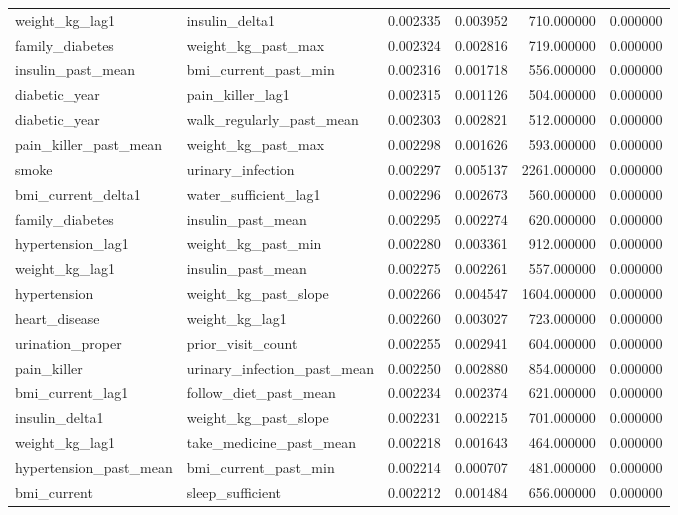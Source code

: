 \begin{longtable}{llrrrr}
weight\_kg\_lag1 & insulin\_delta1 & 0.002335 & 0.003952 & 710.000000 & 0.000000 \\
family\_diabetes & weight\_kg\_past\_max & 0.002324 & 0.002816 & 719.000000 & 0.000000 \\
insulin\_past\_mean & bmi\_current\_past\_min & 0.002316 & 0.001718 & 556.000000 & 0.000000 \\
diabetic\_year & pain\_killer\_lag1 & 0.002315 & 0.001126 & 504.000000 & 0.000000 \\
diabetic\_year & walk\_regularly\_past\_mean & 0.002303 & 0.002821 & 512.000000 & 0.000000 \\
pain\_killer\_past\_mean & weight\_kg\_past\_max & 0.002298 & 0.001626 & 593.000000 & 0.000000 \\
smoke & urinary\_infection & 0.002297 & 0.005137 & 2261.000000 & 0.000000 \\
bmi\_current\_delta1 & water\_sufficient\_lag1 & 0.002296 & 0.002673 & 560.000000 & 0.000000 \\
family\_diabetes & insulin\_past\_mean & 0.002295 & 0.002274 & 620.000000 & 0.000000 \\
hypertension\_lag1 & weight\_kg\_past\_min & 0.002280 & 0.003361 & 912.000000 & 0.000000 \\
weight\_kg\_lag1 & insulin\_past\_mean & 0.002275 & 0.002261 & 557.000000 & 0.000000 \\
hypertension & weight\_kg\_past\_slope & 0.002266 & 0.004547 & 1604.000000 & 0.000000 \\
heart\_disease & weight\_kg\_lag1 & 0.002260 & 0.003027 & 723.000000 & 0.000000 \\
urination\_proper & prior\_visit\_count & 0.002255 & 0.002941 & 604.000000 & 0.000000 \\
pain\_killer & urinary\_infection\_past\_mean & 0.002250 & 0.002880 & 854.000000 & 0.000000 \\
bmi\_current\_lag1 & follow\_diet\_past\_mean & 0.002234 & 0.002374 & 621.000000 & 0.000000 \\
insulin\_delta1 & weight\_kg\_past\_slope & 0.002231 & 0.002215 & 701.000000 & 0.000000 \\
weight\_kg\_lag1 & take\_medicine\_past\_mean & 0.002218 & 0.001643 & 464.000000 & 0.000000 \\
hypertension\_past\_mean & bmi\_current\_past\_min & 0.002214 & 0.000707 & 481.000000 & 0.000000 \\
bmi\_current & sleep\_sufficient & 0.002212 & 0.001484 & 656.000000 & 0.000000 \\

\end{longtable}

